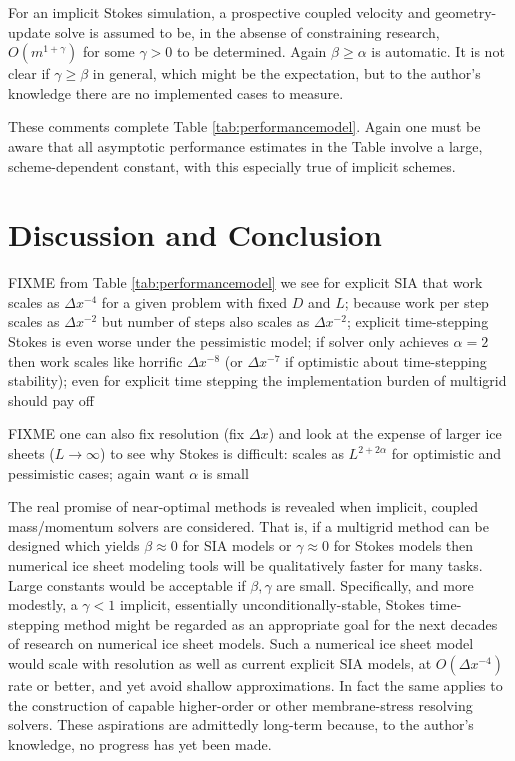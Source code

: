\documentclass[twocolumn,letterpaper]{igs}
\begin{document}
For an implicit Stokes simulation, a prospective coupled velocity and geometry-update solve is assumed to be, in the absense of constraining research, $O(m^{1+\gamma})$ for some $\gamma>0$ to be determined.  Again $\beta \ge \alpha$ is automatic.  It is not clear if $\gamma\ge \beta$ in general, which might be the expectation, but to the author's knowledge there are no implemented cases to measure.

These comments complete Table \ref{tab:performancemodel}.  Again one must be aware that all asymptotic performance estimates in the Table involve a large, scheme-dependent constant, with this especially true of implicit schemes.


\section{Discussion and Conclusion}

FIXME from Table \ref{tab:performancemodel} we see for explicit SIA that work scales as $\Delta x^{-4}$ for a given problem with fixed $D$ and $L$; because work per step scales as $\Delta x^{-2}$ but number of steps also scales as $\Delta x^{-2}$; explicit time-stepping Stokes is even worse under the pessimistic model; if solver only achieves $\alpha=2$ then work scales like horrific $\Delta x^{-8}$ (or $\Delta x^{-7}$ if optimistic about time-stepping stability); even for explicit time stepping the implementation burden of multigrid should pay off

FIXME one can also fix resolution (fix $\Delta x$) and look at the expense of larger ice sheets ($L\to \infty$) to see why Stokes is difficult: scales as $L^{2+2\alpha}$ for optimistic and pessimistic cases; again want $\alpha$ is small

The real promise of near-optimal methods is revealed when implicit, coupled mass/momentum solvers are considered.  That is, if a multigrid method can be designed which yields $\beta\approx 0$ for SIA models or $\gamma\approx 0$ for Stokes models then numerical ice sheet modeling tools will be qualitatively faster for many tasks.  Large constants would be acceptable if $\beta,\gamma$ are small.  Specifically, and more modestly, a $\gamma < 1$ implicit, essentially unconditionally-stable, Stokes time-stepping method might be regarded as an appropriate goal for the next decades of research on numerical ice sheet models.  Such a numerical ice sheet model would scale with resolution as well as current explicit SIA models, at $O(\Delta x^{-4})$ rate or better, and yet avoid shallow approximations.  In fact the same applies to the construction of capable higher-order or other membrane-stress resolving solvers.   These aspirations are admittedly long-term because, to the author's knowledge, no progress has yet been made.



\end{document}
